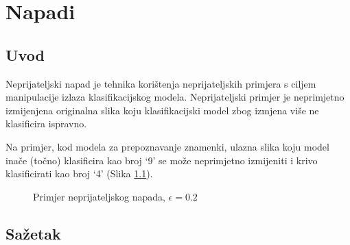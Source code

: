 \chapter{Napadi}

\newcommand{\norm}[1]{\left\|{#1}\right\|}

\section{Uvod}

Neprijateljski napad je tehnika korištenja neprijateljskih primjera s ciljem manipulacije izlaza klasifikacijskog modela. Neprijateljski primjer je neprimjetno izmijenjena originalna slika koju klasifikacijski model zbog izmjena više ne klasificira ispravno.

Na primjer, kod modela za prepoznavanje znamenki, ulazna slika koju model inače (točno) klasificira kao broj ‘9’ se može neprimjetno izmijeniti i krivo klasificirati kao broj ‘4’ (Slika \ref{fig:uvod_example}).

\begin{figure}[H]
    \centering
    \qquad
    \caption{Primjer neprijateljskog napada, $\epsilon = 0.2$}%
    \label{fig:uvod_example}%
\end{figure}

\section{Sažetak} 

